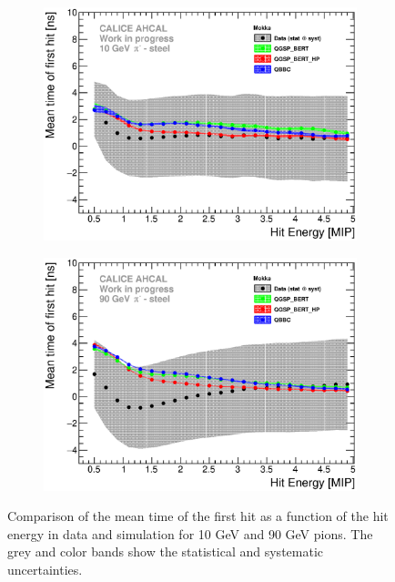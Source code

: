 \begin{figure}[htbp!]
	\begin{subfigure}[t]{0.49\textwidth}
		\centering
		\includegraphics[width=1\textwidth]{../Thesis_Plots/Timing/Pions/Plots/ComparisonToSim/Time_Energy_10GeV_Mokka.eps}
		\caption{} \label{fig:Energy_SimData_10GeV}
	\end{subfigure}
	\hfill
	\begin{subfigure}[t]{0.49\textwidth}
		\centering
		\includegraphics[width=1\textwidth]{../Thesis_Plots/Timing/Pions/Plots/ComparisonToSim/Time_Energy_90GeV_Mokka.eps}
		\caption{} \label{fig:Energy_SimData_90GeV}
	\end{subfigure}
	\caption{Comparison of the mean time of the first hit as a function of the hit energy in data and \mokka simulation for 10 GeV and 90 GeV pions. The grey and color bands show the statistical and systematic uncertainties.}
\end{figure}

